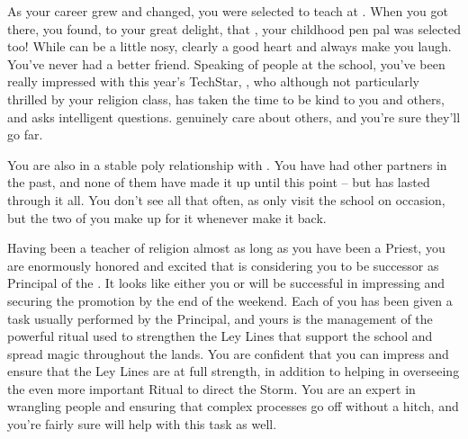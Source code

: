 \documentclass[char]{GL2020}
\begin{document}
As your career grew and changed, you were selected to teach at \pSchool{}. When you got there, you found, to your great delight, that \cMusic{}, your childhood pen pal was selected too! While \cMusic{} can be a little nosy, \cMusic{\they} clearly \cMusic{\have} a good heart and always make you laugh. You’ve never had a better friend.  Speaking of people at the school, you’ve been really impressed with this year’s TechStar, \cTechStar{}, who although not particularly thrilled by your religion class, has taken the time to be kind to you and others, and asks intelligent questions.  \cTechStar{\they} genuinely care about others, and you’re sure they’ll go far.

You are also in a stable poly relationship with \cJuniorStatesman{}. You have had other partners in the past, and none of them have made it up until this point -- but \cJuniorStatesman{} has lasted through it all. You don’t see \cJuniorStatesman{\them} all that often, as \cJuniorStatesman{\they} only visit \cJuniorStatesman{\plural} the school on occasion, but the two of you make up for it whenever \cJuniorStatesman{\they} \cJuniorStatesman{\does} make it back.

Having been a teacher of religion almost as long as you have been a Priest, you are enormously honored and excited that \cPrincipal{} is considering you to be \cPrincipal{\their} successor as Principal of the \pSchool{}.  It looks like either you or \cMusic{} will be successful in impressing \cPrincipal{} and securing the promotion by the end of the weekend.  Each of you has been given a task usually performed by the Principal, and yours is the management of the powerful ritual used to strengthen the Ley Lines that support the school and spread magic throughout the lands.  You are confident that you can impress \cPrincipal{} and ensure that the Ley Lines are at full strength, in addition to helping \cPrincipal{} in overseeing the even more important Ritual to direct the Storm. You are an expert in wrangling people and ensuring that complex processes go off without a hitch, and you’re fairly sure \cPrince{} will help with this task as well.
\end{document}
